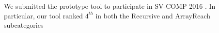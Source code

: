 We submitted the prototype tool to participate in SV-COMP 2016 \cite{svcomp16}. In particular, our tool ranked $4^{th}$ in both the Recursive and ArrayReach subcategories 


\begin{comment}
Numerous intraprocedural analysis techniques have been developed over the years.
Many tools are in fact freely available (see, for instance,
\textsc{Blast}~\cite{BeyerHJM07}, \textsc{CPAchecker}~\cite{BeyerK11}, and
\textsc{UFO}~\cite{AlbarghouthiLGC12}).
Interprocedural analysis techniques are also available (see~\cite{RepsHS95,
BallR01,CousotCFMMMR05,CuoqKKPSY12,coverity,polyspace} for a partial list).
Recently, recursive analysis attracts new attention.
The Competition on Software Verification adds a new category for recursive
programs in 2014~\cite{svcomp14}.
Among the participants, \textsc{CBMC}~\cite{ClarkeKL04},
\textsc{Ultimate Automizer}~\cite{HeizmannCDEHLNSP13}, and
\textsc{Ultimiate Kojak}~\cite{ErmisNDHP14} are the top three tools for the
\textbf{recursive} category.

Inspired by \textsc{Whale}~\cite{AlbarghouthiGC12}, we use inductive invariants
obtained from verifying under-approximation as candidates of summaries.
Also, similar to \textsc{Whale}, we apply a Hoare logic proof rule for recursive
calls from~\cite{Oheimb99}.
However, our technique works on control flow graphs and builds on an
intraprocedural analysis tool.
It is hence very lightweight and modular.
Better intraprocedural analysis tools easily give better recursive analysis
through our technique.
\textsc{Whale}, on the other hand, analyzes by exploring abstract reachability
graphs.
Since \textsc{Whale} extends summary computation and covering relations for
recursion, its implementation is more involved.

Aside from recursion analysis, using program transformation to reduce program
features is not a new concept.
We learned this concept particularly from~\cite{LalR08,LalR09},
where a program transformation technique for checking context-bounded concurrent
programs to sequential analysis is developed.
\end{comment}

